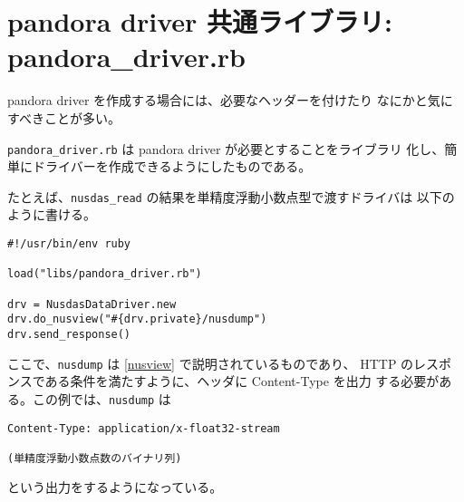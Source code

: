 \section{pandora driver 共通ライブラリ: pandora\_driver.rb}
pandora driver を作成する場合には、必要なヘッダーを付けたり
なにかと気にすべきことが多い。

{\tt pandora\_driver.rb} は pandora driver が必要とすることをライブラリ
化し、簡単にドライバーを作成できるようにしたものである。

たとえば、{\tt nusdas\_read} の結果を単精度浮動小数点型で渡すドライバは
以下のように書ける。
\begin{verbatim}
#!/usr/bin/env ruby

load("libs/pandora_driver.rb")

drv = NusdasDataDriver.new
drv.do_nusview("#{drv.private}/nusdump")
drv.send_response()
\end{verbatim}
ここで、{\tt nusdump} は \ref{nusview} で説明されているものであり、
HTTP のレスポンスである条件を満たすように、ヘッダに Content-Type を出力
する必要がある。この例では、{\tt nusdump} は

\begin{verbatim}
Content-Type: application/x-float32-stream

(単精度浮動小数点数のバイナリ列)
\end{verbatim}
という出力をするようになっている。
